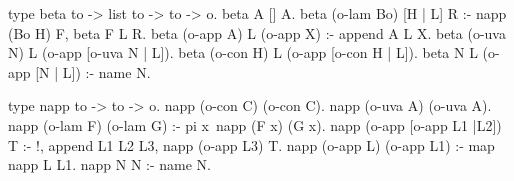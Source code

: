   type beta to -> list to -> to -> o.
  beta A [] A.
  beta (o-lam Bo) [H | L] R :- napp (Bo H) F, beta F L R.
  beta (o-app A) L (o-app X) :- append A L X.
  beta (o-uva N) L (o-app [o-uva N | L]).
  beta (o-con H) L (o-app [o-con H | L]).
  beta N L (o-app [N | L]) :- name N.

  type napp to -> to -> o.
  napp (o-con C) (o-con C).
  napp (o-uva A) (o-uva A).
  napp (o-lam F) (o-lam G) :- pi x\ napp (F x) (G x).
  napp (o-app [o-app L1 |L2]) T :- !,
    append L1 L2 L3, napp (o-app L3) T.
  napp (o-app L) (o-app L1) :- map napp L L1.
  napp N N :- name N.
